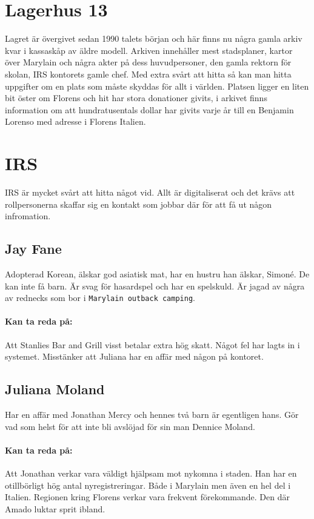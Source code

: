 \documentclass[a5paper,10pt]{report}
\begin{document}
\section{Lagerhus 13}
Lagret är övergivet sedan 1990 talets början och här finns nu några gamla arkiv kvar i kassaskåp av äldre modell. Arkiven innehåller mest stadsplaner, kartor över Marylain och några akter på dess huvudpersoner, den gamla rektorn för skolan, IRS kontorets gamle chef. Med extra svårt att hitta så kan man hitta uppgifter om en plats som måste skyddas för allt i världen. Platsen ligger en liten bit öster om Florens och hit har stora donationer givits, i arkivet finns information om att hundratusentals dollar har givits varje år till en Benjamin Lorenso med adresse i Florens Italien.
\section{IRS}
IRS är mycket svårt att hitta något vid. Allt är digitaliserat och det krävs att rollpersonerna skaffar sig en kontakt som jobbar där för att få ut någon infromation.
\subsection{Jay Fane}
Adopterad Korean, älskar god asiatisk mat, har en hustru han älskar, Simoné. De kan inte få barn. Är svag för hasardspel och har en spelskuld. Är jagad av några av rednecks som bor i \texttt{Marylain outback camping}.
\paragraph{Kan ta reda på:} Att Stanlies Bar and Grill visst betalar extra hög skatt. Något fel har lagts in i systemet. Misstänker att Juliana har en affär med någon på kontoret.
\subsection{Juliana Moland}
Har en affär med Jonathan Mercy och hennes två barn är egentligen hans. Gör vad som helst för att inte bli avslöjad för sin man Dennice Moland.
\paragraph{Kan ta reda på:} Att Jonathan verkar vara väldigt hjälpsam mot nykomna i staden. Han har en otillbörligt hög antal nyregistreringar. Både i Marylain men även en hel del i Italien. Regionen kring Florens verkar vara frekvent förekommande. Den där Amado luktar sprit ibland.
\end{document}
